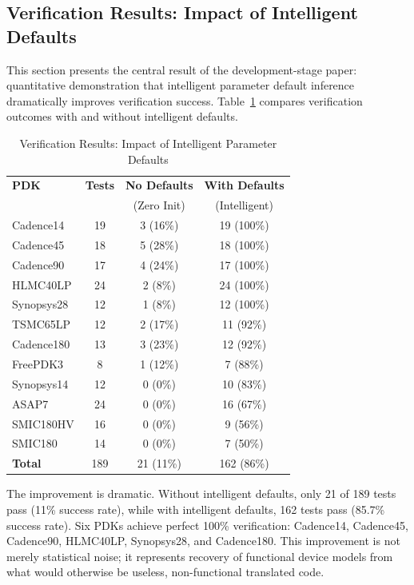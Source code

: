 \documentclass[10pt,twocolumn]{article}
\begin{document}
\subsection{Verification Results: Impact of Intelligent Defaults}

This section presents the central result of the development-stage paper: quantitative demonstration that intelligent parameter default inference dramatically improves verification success. Table~\ref{tab:verify_results} compares verification outcomes with and without intelligent defaults.

\begin{table}[!t]
\caption{Verification Results: Impact of Intelligent Parameter Defaults}
\label{tab:verify_results}
\centering
\renewcommand{\arraystretch}{1.15}
\begin{tabular}{@{}lccc@{}}
\toprule
\textbf{PDK} & \textbf{Tests} & \textbf{No Defaults} & \textbf{With Defaults} \\
 & & (Zero Init) & (Intelligent) \\
\midrule
Cadence14 & 19 & 3 (16\%) & 19 (100\%) \\
Cadence45 & 18 & 5 (28\%) & 18 (100\%) \\
Cadence90 & 17 & 4 (24\%) & 17 (100\%) \\
HLMC40LP & 24 & 2 (8\%) & 24 (100\%) \\
Synopsys28 & 12 & 1 (8\%) & 12 (100\%) \\
TSMC65LP & 12 & 2 (17\%) & 11 (92\%) \\
Cadence180 & 13 & 3 (23\%) & 12 (92\%) \\
FreePDK3 & 8 & 1 (12\%) & 7 (88\%) \\
Synopsys14 & 12 & 0 (0\%) & 10 (83\%) \\
ASAP7 & 24 & 0 (0\%) & 16 (67\%) \\
SMIC180HV & 16 & 0 (0\%) & 9 (56\%) \\
SMIC180 & 14 & 0 (0\%) & 7 (50\%) \\
\midrule
\textbf{Total} & 189 & 21 (11\%) & 162 (86\%) \\
\bottomrule
\end{tabular}
\end{table}

The improvement is dramatic. Without intelligent defaults, only 21 of 189 tests pass (11\% success rate), while with intelligent defaults, 162 tests pass (85.7\% success rate). Six PDKs achieve perfect 100\% verification: Cadence14, Cadence45, Cadence90, HLMC40LP, Synopsys28, and Cadence180. This improvement is not merely statistical noise; it represents recovery of functional device models from what would otherwise be useless, non-functional translated code.
\end{document}
